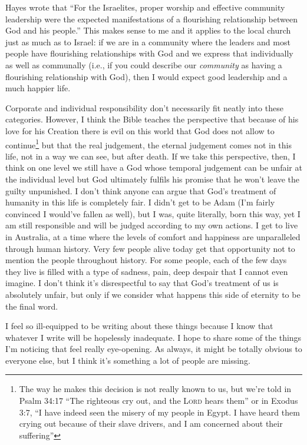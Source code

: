 Hayes wrote that \enquote{For the Israelites, proper worship and effective
community leadership were the expected manifestations of a flourishing
relationship between God and his people.}
\autocite[471]{hayes:2012} This makes sense to me and it applies to the local
church just as much as to Israel: if we are in a community where the leaders and
most people have flourishing relationships with God and we express that
individually as well as communally (i.e., if you could describe our
\emph{community} as having a flourishing relationship with God), then I would
expect good leadership and a much happier life.

Corporate and individual responsibility don't necessarily fit neatly into these
categories. However, I think the Bible teaches the perspective that because of
his love for his Creation there is evil on this world that God does not allow to
continue\footnote{%
The way he makes this decision is not really known to us, but we're told in
Psalm 34:17 \enquote{The righteous cry out, and the \textsc{Lord} hears
them} or in Exodus 3:7, \enquote{I have indeed seen the misery of my people
in Egypt. I have heard them crying out because of their slave drivers, and I
am concerned about their suffering}
} but that the real judgement, the eternal judgement comes not in this life, not
in a way we can see, but after death. If we take this perspective, then, I think
on one level we still have a God whose temporal judgement can be unfair at the
individual level but God ultimately fulfils his promise that he won't leave the
guilty unpunished. I don't think anyone can argue that God's treatment of
humanity in this life is completely fair. I didn't get to be Adam (I'm fairly
convinced I would've fallen as well), but I was, quite literally, born this way,
yet I am still responsible and will be judged according to my own actions. I get
to live in Australia, at a time where the levels of comfort and happiness are
unparalleled through human history. Very few people alive today get that
opportunity not to mention the people throughout history. For some people, each
of the few days they live is filled with a type of sadness, pain, deep despair
that I cannot even imagine. I don't think it's disrespectful to say that God's
treatment of us is absolutely unfair, but only if we consider what happens this
side of eternity to be the final word.

I feel so ill-equipped to be writing about these things because I know that
whatever I write will be hopelessly inadequate. I hope to share some of the
things I'm noticing that feel really eye-opening. As always, it might be totally
obvious to everyone else, but I think it's something a lot of people are
missing.



